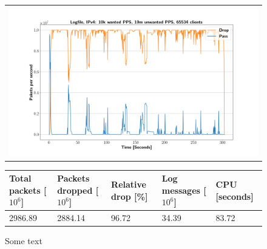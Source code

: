 \begin{figure}[h!]
	\label{fig:simplefail2ban:disk:ip4:10m}
	\centering
	\scriptsize
	\begin{tabular}{c}
    	\centerline{\includegraphics[width=1.2\textwidth]{images/simplefail2ban_disk_ipv4_v10k_iv10m_c65534.png}}
	\end{tabular}
	\begin{tabular}{lllll}
		\toprule
		\textbf{Total packets [$10^6$]} & \textbf{Packets dropped [$10^6$]} & \textbf{Relative drop [\%]} & \textbf{Log messages [$10^6$]} & \textbf{CPU [seconds]} \\ \midrule 
		2986.89 & 2884.14 & 96.72 & 34.39 & 83.72 \\
		\bottomrule
	\end{tabular}
	\caption[Simplefail2ban, Logfile IPv4, 10m \ac{PPS}]{Some text}
\end{figure}

